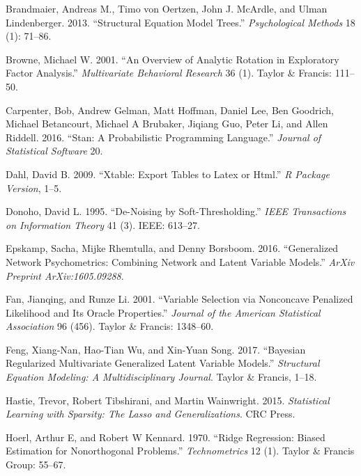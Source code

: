 

\hypertarget{refs}{}
\hypertarget{ref-brandmaier2013}{}
Brandmaier, Andreas M., Timo von Oertzen, John J. McArdle, and Ulman
Lindenberger. 2013. ``Structural Equation Model Trees.''
\emph{Psychological Methods} 18 (1): 71--86.

\hypertarget{ref-browne2001}{}
Browne, Michael W. 2001. ``An Overview of Analytic Rotation in
Exploratory Factor Analysis.'' \emph{Multivariate Behavioral Research}
36 (1). Taylor \& Francis: 111--50.

\hypertarget{ref-carpenter2016stan}{}
Carpenter, Bob, Andrew Gelman, Matt Hoffman, Daniel Lee, Ben Goodrich,
Michael Betancourt, Michael A Brubaker, Jiqiang Guo, Peter Li, and Allen
Riddell. 2016. ``Stan: A Probabilistic Programming Language.''
\emph{Journal of Statistical Software} 20.

\hypertarget{ref-dahl2009xtable}{}
Dahl, David B. 2009. ``Xtable: Export Tables to Latex or Html.'' \emph{R
Package Version}, 1--5.

\hypertarget{ref-donoho1995noising}{}
Donoho, David L. 1995. ``De-Noising by Soft-Thresholding.'' \emph{IEEE
Transactions on Information Theory} 41 (3). IEEE: 613--27.

\hypertarget{ref-epskamp2016generalized}{}
Epskamp, Sacha, Mijke Rhemtulla, and Denny Borsboom. 2016. ``Generalized
Network Psychometrics: Combining Network and Latent Variable Models.''
\emph{ArXiv Preprint ArXiv:1605.09288}.

\hypertarget{ref-fan2001variable}{}
Fan, Jianqing, and Runze Li. 2001. ``Variable Selection via Nonconcave
Penalized Likelihood and Its Oracle Properties.'' \emph{Journal of the
American Statistical Association} 96 (456). Taylor \& Francis: 1348--60.

\hypertarget{ref-feng2017bayesian}{}
Feng, Xiang-Nan, Hao-Tian Wu, and Xin-Yuan Song. 2017. ``Bayesian
Regularized Multivariate Generalized Latent Variable Models.''
\emph{Structural Equation Modeling: A Multidisciplinary Journal}. Taylor
\& Francis, 1--18.

\hypertarget{ref-hastie2015statistical}{}
Hastie, Trevor, Robert Tibshirani, and Martin Wainwright. 2015.
\emph{Statistical Learning with Sparsity: The Lasso and
Generalizations}. CRC Press.

\hypertarget{ref-hoerl1970}{}
Hoerl, Arthur E, and Robert W Kennard. 1970. ``Ridge Regression: Biased
Estimation for Nonorthogonal Problems.'' \emph{Technometrics} 12 (1).
Taylor \& Francis Group: 55--67.

